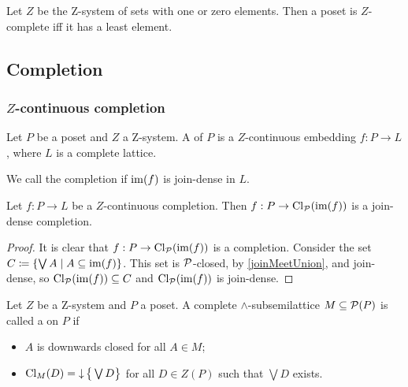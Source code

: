 Let $Z$ be the $\mathrm{Z}$-system of sets with one or zero elements. Then a poset is $Z$-complete iff it has a least element.

\subsection{Completion}
\subsubsection{$Z$-continuous completion}
\begin{definition}
Let $P$ be a poset and $Z$ a $\mathrm{Z}$-system. A  of $P$ is a $Z$-continuous embedding $f: P \to L$, where $L$ is a complete lattice.

We call the completion  if $\operatorname{im}(f)$ is join-dense in $L$.
\end{definition}

\begin{lemma} \label{closureGivesJoinDenseCompletion}
Let $f: P \to L$ be a $Z$-continuous completion. Then $f: P\to \operatorname{Cl}_{\operatorname{\mathcal{P}}}(\operatorname{im}(f))$ is a join-dense completion.
\end{lemma}
\begin{proof}
It is clear that $f: P\to \operatorname{Cl}_{\operatorname{\mathcal{P}}}(\operatorname{im}(f))$ is a completion. Consider the set $C \defeq \setbuilder{\bigvee A}{A\subseteq \im(f)}$. This set is $\operatorname{\mathcal{P}}$-closed, by \ref{joinMeetUnion}, and join-dense, so $\operatorname{Cl}_{\operatorname{\mathcal{P}}}(\operatorname{im}(f)) \subseteq C$ and $\operatorname{Cl}_{\operatorname{\mathcal{P}}}(\operatorname{im}(f))$ is join-dense.
\end{proof}

\begin{definition}
Let $Z$ be a $\mathrm{Z}$-system and $P$ a poset. A complete $\wedge$-subsemilattice $M\subseteq \operatorname{\mathcal{P}}(P)$ is called a  on $P$ if
\begin{itemize}
\item $A$ is downwards closed for all $A\in M$;
\item $\operatorname{Cl}_{M}(D) = \operatorname{\downarrow}\big\{\bigvee D\big\}$ for all $D\in Z(P)$ such that $\bigvee D$ exists.
\end{itemize}
\end{definition}

